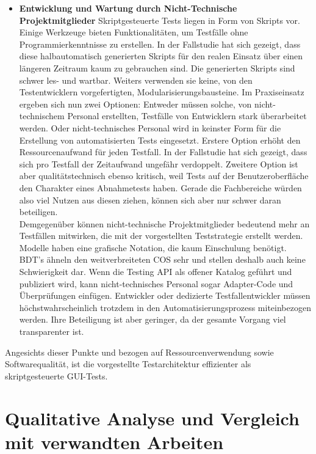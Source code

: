\begin{itemize}
\item \textbf{Entwicklung und Wartung durch Nicht-Technische Projektmitglieder} Skriptgesteuerte Tests liegen in Form von Skripts vor. Einige Werkzeuge bieten Funktionalitäten, um Testfälle ohne Programmierkenntnisse zu erstellen. In der Fallstudie hat sich gezeigt, dass diese halbautomatisch generierten Skripts für den realen Einsatz über einen längeren Zeitraum kaum zu gebrauchen sind. Die generierten Skripts sind schwer les- und wartbar. Weiters verwenden sie keine, von den Testentwicklern vorgefertigten, Modularisierungsbausteine. Im Praxiseinsatz ergeben sich nun zwei Optionen: Entweder müssen solche, von nicht-technischem Personal erstellten, Testfälle von Entwicklern stark überarbeitet werden. Oder nicht-technisches Personal wird in keinster Form für die Erstellung von automatisierten Tests eingesetzt. Erstere Option erhöht den Ressourcenaufwand für jeden Testfall. In der Fallstudie hat sich gezeigt, dass sich pro Testfall der Zeitaufwand ungefähr verdoppelt. Zweitere Option ist aber qualitätstechnisch ebenso kritisch, weil Tests auf der Benutzeroberfläche den Charakter eines Abnahmetests haben. Gerade die Fachbereiche würden also viel Nutzen aus diesen ziehen, können sich aber nur schwer daran beteiligen.\\
Demgegenüber können nicht-technische Projektmitglieder bedeutend mehr an Testfällen mitwirken, die mit der vorgestellten Teststrategie erstellt werden. Modelle haben eine grafische Notation, die kaum Einschulung benötigt. \Gls{BDT}'s ähneln den weitverbreiteten \Gls{COS} sehr und stellen deshalb auch keine Schwierigkeit dar. Wenn die Testing API als offener Katalog geführt und publiziert wird, kann nicht-technisches Personal sogar Adapter-Code und Überprüfungen einfügen. Entwickler oder dedizierte Testfallentwickler müssen höchstwahrscheinlich trotzdem in den Automatisierungsprozess miteinbezogen werden. Ihre Beteiligung ist aber geringer, da der gesamte Vorgang viel transparenter ist.
\end{itemize}

Angesichts dieser Punkte und bezogen auf Ressourcenverwendung sowie Softwarequalität, ist die vorgestellte Testarchitektur effizienter als skriptgesteuerte GUI-Tests.

\section{Qualitative Analyse und Vergleich mit verwandten Arbeiten}

